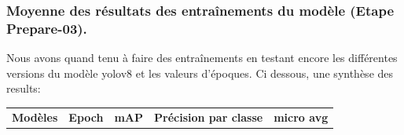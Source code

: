 \subsubsection{Moyenne des résultats des entraînements du modèle (Etape Prepare-03).}

Nous avons quand tenu à faire des entraînements en testant encore les différentes versions du modèle yolov8 et les valeurs d'époques.
Ci dessous, une synthèse des results:

\begin{table}[H]
    \centering
    \begin{tabular}{|c|c|c|c|c|c|c|c|}
        \hline
        \multirow{2}{*}{\textbf{Modèles}} & \multirow{2}{*}{\textbf{Epoch}} & \multirow{2}{*}{\textbf{mAP}} & \multicolumn{4}{c|}{\textbf{Précision par classe}} & \multirow{2}{*}{\textbf{micro avg}}                      \\ \cline{4-7}


\end{tabular}
\end{table}
